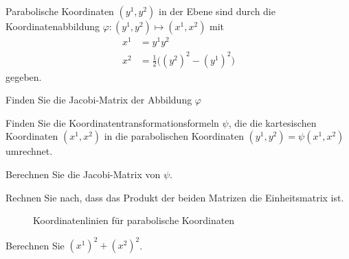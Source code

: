 Parabolische Koordinaten $(y^1,y^2)$ in der Ebene sind durch die
%
Koordinatenabbildung  $\varphi\colon (y^1,y^2)\mapsto (x^1,x^2)$ mit
\begin{align}
x^1 &= y^1y^2
\label{buch:202:eq1}
\\
x^2 &= \frac12\bigl((y^2)^2 - (y^1)^2\bigr)
\label{buch:202:eq2}
\end{align}
gegeben.
\begin{teilaufgaben}
\item 
Finden Sie die Jacobi-Matrix der Abbildung $\varphi$
\item
Finden Sie die Koordinatentransformationsformeln $\psi$, die die
kartesischen Koordinaten $(x^1,x^2)$ in die parabolischen Koordinaten
$(y^1,y^2)=\psi(x^1,x^2)$ umrechnet.
\item
Berechnen Sie die Jacobi-Matrix von $\psi$.
\item
Rechnen Sie nach, dass das Produkt der beiden Matrizen die Einheitsmatrix ist.
\end{teilaufgaben}
\begin{figure}
\centering
{}
\caption{Koordinatenlinien für parabolische Koordinaten
\label{202:fig:koordinatenlinien}}
\end{figure}

\begin{hinweis}
Berechnen Sie $(x^1)^2+(x^2)^2$.
\end{hinweis}

